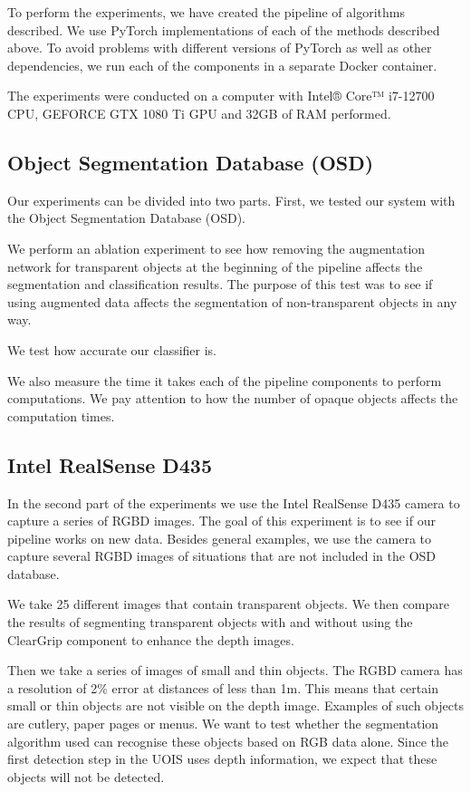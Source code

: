 \documentclass[10pt,twocolumn,letterpaper]{article}
\begin{document}
To perform the experiments, we have created the pipeline of algorithms described. We use PyTorch \cite{Paszke_Gross_Massa_Lerer_Bradbury_Chanan_Killeen_Lin_Gimelshein_Antiga_et} implementations \cite{UOIS-git} \cite{ClearGrasp-git} of each of the methods described above. To avoid problems with different versions of PyTorch as well as other dependencies, we run each of the components in a separate Docker container.

The experiments were conducted on a computer with Intel® Core™ i7-12700 CPU,
GEFORCE GTX 1080 Ti GPU and 32GB of RAM performed.

\subsection{Object Segmentation Database (OSD)}

Our experiments can be divided into two parts. First, we tested our system with the Object Segmentation Database (OSD).

We perform an ablation experiment to see how removing the augmentation network for transparent objects at the beginning of the pipeline affects the segmentation and classification results. The purpose of this test was to see if using augmented data affects the segmentation of non-transparent objects in any way.

We test how accurate our classifier is.

We also measure the time it takes each of the pipeline components to perform computations. We pay attention to how the number of opaque objects affects the computation times.

\subsection{Intel RealSense D435}

In the second part of the experiments we use the Intel RealSense D435 camera to capture a series of RGBD images. The goal of this experiment is to see if our pipeline works on new data. Besides general examples, we use the camera to capture several RGBD images of situations that are not included in the OSD database.

We take 25 different images that contain transparent objects. We then compare the results of segmenting transparent objects with and without using the ClearGrip component to enhance the depth images.

Then we take a series of images of small and thin objects. The RGBD camera has a resolution of 2\% error at distances of less than 1m. This means that certain small or thin objects are not visible on the depth image. Examples of such objects are cutlery, paper pages or menus. We want to test whether the segmentation algorithm used can recognise these objects based on RGB data alone. Since the first detection step in the UOIS uses depth information, we expect that these objects will not be detected.












{\small


}
\end{document}
